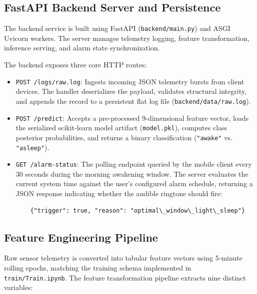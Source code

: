 \documentclass[journal,11pt,onecolumn]{IEEEtran}
\begin{document}
\subsection{FastAPI Backend Server and Persistence}
The backend service is built using FastAPI (\texttt{backend/main.py}) and ASGI Uvicorn workers. The server manages telemetry logging, feature transformation, inference serving, and alarm state synchronization.

The backend exposes three core HTTP routes:
\begin{itemize}[leftmargin=*]
    \item \texttt{POST /logs/raw.log}: Ingests incoming JSON telemetry bursts from client devices. The handler deserializes the payload, validates structural integrity, and appends the record to a persistent flat log file (\texttt{backend/data/raw.log}).
    \item \texttt{POST /predict}: Accepts a pre-processed 9-dimensional feature vector, loads the serialized scikit-learn model artifact (\texttt{model.pkl}), computes class posterior probabilities, and returns a binary classification (\texttt{"awake"} vs. \texttt{"asleep"}).
    \item \texttt{GET /alarm-status}: The polling endpoint queried by the mobile client every 30 seconds during the morning awakening window. The server evaluates the current system time against the user's configured alarm schedule, returning a JSON response indicating whether the audible ringtone should fire:
    \begin{lstlisting}
    {"trigger": true, "reason": "optimal\_window\_light\_sleep"}
    \end{lstlisting}
\end{itemize}

\subsection{Feature Engineering Pipeline}
Raw sensor telemetry is converted into tabular feature vectors using 5-minute rolling epochs, matching the training schema implemented in \texttt{train/Train.ipynb}. The feature transformation pipeline extracts nine distinct variables:
\end{document}
